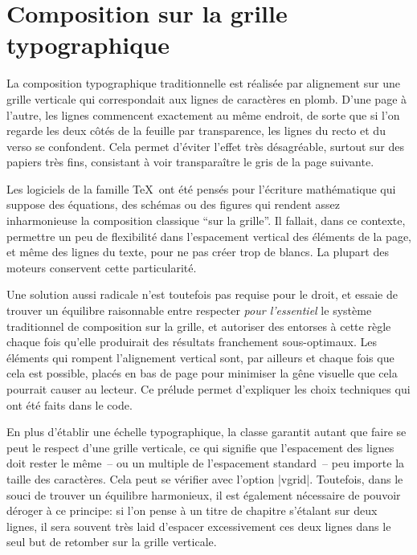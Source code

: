 \section{Composition sur la grille typographique}

\label{Composition-Grille} La composition typographique traditionnelle est réalisée par alignement sur une grille verticale qui correspondait aux lignes de caractères en plomb. D'une page à l'autre, les lignes commencent exactement au même endroit, de sorte que si l'on regarde les deux côtés de la feuille par transparence, les lignes du recto et du verso se confondent. Cela permet d'éviter l'effet très désagréable, surtout sur des papiers très fins, consistant à voir transparaître le gris de la page suivante.

Les logiciels de la famille \TeX\ ont été pensés pour l'écriture mathématique qui suppose des équations, des schémas ou des figures qui rendent assez inharmonieuse la composition classique \enquote{sur la grille}. Il fallait, dans ce contexte, permettre un peu de flexibilité dans l'espacement vertical des éléments de la page, et même des lignes du texte, pour ne pas créer trop de blancs. La plupart des moteurs conservent cette particularité.

Une solution aussi radicale n'est toutefois pas requise pour le droit, et \frenchlaw essaie de trouver un équilibre raisonnable entre respecter \emph{pour l'essentiel} le système traditionnel de composition sur la grille, et autoriser des entorses à cette règle chaque fois qu'elle produirait des résultats franchement sous-optimaux. Les éléments qui rompent l'alignement vertical sont, par ailleurs et chaque fois que cela est possible, placés en bas de page pour minimiser la gêne visuelle que cela pourrait causer au lecteur. Ce prélude permet d'expliquer les choix techniques qui ont été faits dans le code.

En plus d'établir une échelle typographique, la classe garantit autant que faire se peut le respect d'une grille verticale, ce qui signifie que l'espacement des lignes doit rester le même~-- ou un multiple de l'espacement standard~-- peu importe la taille des caractères. Cela peut se vérifier avec l'option |vgrid|. Toutefois, dans le souci de trouver un équilibre harmonieux, il est également nécessaire de pouvoir déroger à ce principe: si l'on pense à un titre de chapitre s'étalant sur deux lignes, il sera souvent très laid d'espacer excessivement ces deux lignes dans le seul but de retomber sur la grille verticale.

